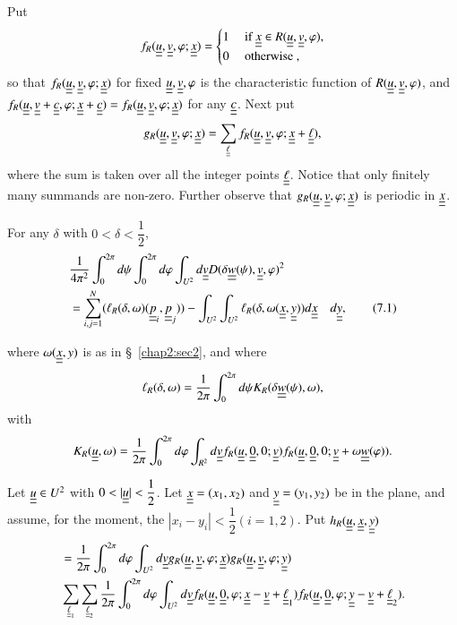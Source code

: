 Put
\begin{equation*}
f_{R} (\uub{u}, \uub{v}, \varphi ; \uub{x}) =
\begin{cases}
1 & \text{ if } \uub{x} \in R (\uub{u}, \uub{v}, \varphi),\\
0 & \text{ otherwise },
\end{cases}
\end{equation*}
so that $f_{R} (\uub{u}, \uub{v}, \varphi ; \uub{x})$ for fixed $\uub{u}, \uub{v}, \varphi$ is the characteristic function of \break $R(\uub{u}, \uub{v}, \varphi)$, and $f_{R} (\uub{u}, \uub{v} + \uub{c} , \varphi ; \uub{x} + \uub{c}) = f_{R} (\uub{u}, \uub{v}, \varphi ; \uub{x})$ for any $\uub{c}$. Next put
$$
g_{R} (\uub{u}, \uub{v}, \varphi ; \uub{x}) = \sum_{\uub{\ell}} f_{R} (\uub{u}, \uub{v}, \varphi ; \uub{x} + \uub{\ell}),
$$
where the sum is taken over all the integer points $\uub{\ell}$. Notice that only finitely many summands are non-zero. Further observe that $g_{R} (\uub{u}, \uub{v}, \varphi ; \uub{x})$ is periodic in $\uub{x}$.

\begin{lemma}\label{chap2:sec7:lem7C}
For any $\delta$ with $0 < \delta < \dfrac{1}{2}$,
\begin{align*}
& \frac{1}{4\pi^{2}} \int_{0}^{2\pi} d\psi \int_{0}^{2\pi} d\varphi \int_{U^{2}} d\uub{v} D(\delta \uub{w} (\psi), \uub{v}, \varphi)^{2}\\
& = \sum_{i, j=1}^{N} (\ell_{R} (\delta, \omega )(\uub{p}_{i}, \uub{p}_{j})) - \int_{U^{2}} \int_{U^{2}} \ell_{R} (\delta, \omega (\uub{x}, \uub{y})) d\uub{x} \quad d\uub{y},\tag{7.1}\label{chap2:sec7:eq7.1}
\end{align*}
\end{lemma}\pageoriginale
where $\omega (\uub{x}, y)$ is as in \S\ \ref{chap2:sec2}, and where
$$
\ell_{R} (\delta, \omega) = \frac{1}{2\pi} \int_{0}^{2\pi} d \psi K_{R} (\delta \uub{w}(\psi), \omega),
$$
with
$$
K_{R} (\uub{u}, \omega) = \frac{1}{2\pi} \int_{0}^{2\pi} d\varphi \int_{R^{2}} d\uub{v} f_{R} (\uub{u}, \uub{0}, 0 ; \uub{v}) f_{R} (\uub{u}, \uub{0}, 0 ; \uub{v} + \omega \uub{w}(\varphi)).
$$

Let $\uub{u} \in U^{2}$ with $0 < |\uub{u}| < \dfrac{1}{2}$. Let $\uub{x} = (x_{1}, x_{2})$ and $\uub{y} = (y_{1}, y_{2})$ be in the plane, and assume, for the moment, the $|x_{i} - y_{i}| < \dfrac{1}{2} (i = 1, 2)$. Put
$h_{R} (\uub{u}, \uub{x}, \uub{y})$
\begin{align*}
 & = \frac{1}{2\pi} \int_{0}^{2\pi} d\varphi \int_{U^{2}} d\uub{v} g_{R} (\uub{u}, \uub{v}, \varphi ; \uub{x}) g_{R} (\uub{u}, \uub{v}, \varphi ; \uub{y})\\
& \sum_{\uub{\ell}_{1}} \sum_{\uub{\ell}_{2}} \frac{1}{2\pi} \int_{0}^{2\pi} d\varphi \int_{U^{2}} d\uub{v} f_{R} (\uub{u}, \uub{0}, \varphi ; \uub{x} - \uub{v} + \uub{\ell}_{1}) f_{R} (\uub{u}, \uub{0}, \varphi ; \uub{y} - \uub{v} + \uub{\ell}_{2}).
\end{align*}

